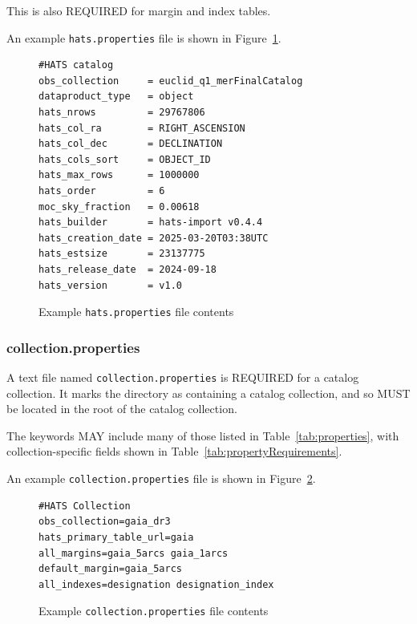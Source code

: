 \documentclass[11pt,a4paper]{ivoa}
\begin{document}
This is also REQUIRED for margin and index tables.

An example \texttt{hats.properties} file is shown in Figure~\ref{fig:examplePropertiesFile}.

\begin{figure}
\begin{minipage}{\linewidth}
\begin{lstlisting}
#HATS catalog
obs_collection     = euclid_q1_merFinalCatalog
dataproduct_type   = object
hats_nrows         = 29767806
hats_col_ra        = RIGHT_ASCENSION
hats_col_dec       = DECLINATION
hats_cols_sort     = OBJECT_ID
hats_max_rows      = 1000000
hats_order         = 6
moc_sky_fraction   = 0.00618
hats_builder       = hats-import v0.4.4
hats_creation_date = 2025-03-20T03:38UTC
hats_estsize       = 23137775
hats_release_date  = 2024-09-18
hats_version       = v1.0
\end{lstlisting}
\end{minipage}
\caption{Example \texttt{hats.properties} file contents}
\label{fig:examplePropertiesFile}
\end{figure}

\subsubsection{collection.properties}\label{sec:collectionProperties}

A text file named \texttt{collection.properties} is REQUIRED for a catalog collection.
It marks the directory as containing a catalog collection, and so MUST be located in the 
root of the catalog collection.

The keywords MAY include many of those listed in Table~\ref{tab:properties}, with collection-specific fields shown in Table~\ref{tab:propertyRequirements}.

An example \texttt{collection.properties} file is shown in Figure~\ref{fig:exampleCollectionPropertiesFile}.

\begin{figure}
\begin{minipage}{\linewidth}
\begin{lstlisting}
#HATS Collection
obs_collection=gaia_dr3
hats_primary_table_url=gaia
all_margins=gaia_5arcs gaia_1arcs
default_margin=gaia_5arcs
all_indexes=designation designation_index
\end{lstlisting}
\end{minipage}
\caption{Example \texttt{collection.properties} file contents}
\label{fig:exampleCollectionPropertiesFile}
\end{figure}
\end{document}
